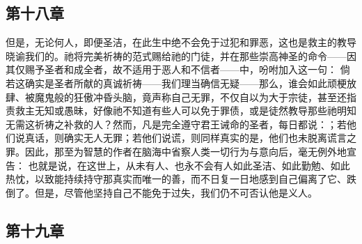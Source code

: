
\subsection{第十八章}

\par

但是，无论何人，即便圣洁，在此生中绝不会免于过犯和罪恶，这也是救主的教导晓谕我们的。祂将完美祈祷的范式赐给祂的门徒，并在那些崇高神圣的命令——因其仅赐予圣者和成全者，故不适用于恶人和不信者——中，吩咐加入这一句：  倘若这确实是圣者所献的真诚祈祷——我们理当确信无疑——那么，谁会如此顽梗放肆、被魔鬼般的狂傲冲昏头脑，竟声称自己无罪，不仅自以为大于宗徒，甚至还指责救主无知或愚昧，好像祂不知道有些人可以免于罪债，或是徒然教导那些祂明知无需这祈祷之补救的人？然而，凡是完全遵守君王诫命的圣者，每日都说：；若他们说真话，则确实无人无罪；若他们说谎，则同样真实的是，他们也未脱离谎言之罪。因此，那至为智慧的作者在脑海中省察人类一切行为与意向后，毫无例外地宣告：  也就是说，在这世上，从未有人、也永不会有人如此圣洁、如此勤勉、如此热忱，以致能持续持守那真实而唯一的善，而不日复一日地感到自己偏离了它、跌倒了。但是，尽管他坚持自己不能免于过失，我们仍不可否认他是义人。\par


\subsection{第十九章}

\par

